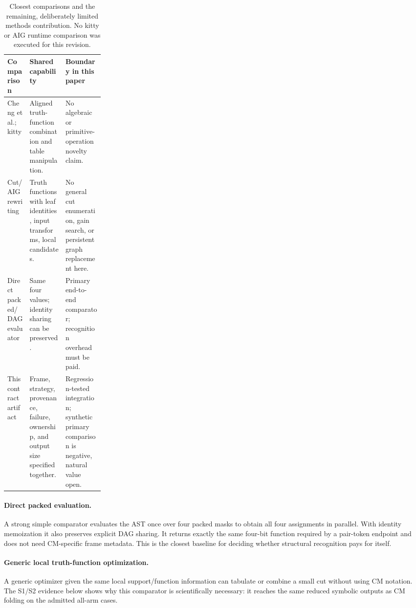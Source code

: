 \documentclass[10pt]{article}
\theoremstyle{plain}
\theoremstyle{definition}
\theoremstyle{remark}
\begin{document}
\begin{table}[H]
\small\centering
\begin{tabularx}{\linewidth}{@{}p{0.23\linewidth}XX@{}}
\toprule
\textbf{Comparison} & \textbf{Shared capability} & \textbf{Boundary in this paper}\\
\midrule
Cheng et al.; kitty & Aligned truth-function combination and table manipulation. & No algebraic or primitive-operation novelty claim.\\
Cut/AIG rewriting & Truth functions with leaf identities, input transforms, local candidates. & No general cut enumeration, gain search, or persistent graph replacement here.\\
Direct packed/DAG evaluator & Same four values; identity sharing can be preserved. & Primary end-to-end comparator; recognition overhead must be paid.\\
This contract artifact & Frame, strategy, provenance, failure, ownership, and output size specified together. & Regression-tested integration; synthetic primary comparison is negative, natural value open.\\
\bottomrule
\end{tabularx}
\caption{Closest comparisons and the remaining, deliberately limited methods contribution. No kitty or AIG runtime comparison was executed for this revision.}
\end{table}

\paragraph{Direct packed evaluation.}
A strong simple comparator evaluates the AST once over four packed masks to obtain all four assignments in parallel. With identity memoization it also preserves explicit DAG sharing. It returns exactly the same four-bit function required by a pair-token endpoint and does not need CM-specific frame metadata. This is the closest baseline for deciding whether structural recognition pays for itself.

\paragraph{Generic local truth-function optimization.}
A generic optimizer given the same local support/function information can tabulate or combine a small cut without using CM notation. The S1/S2 evidence below shows why this comparator is scientifically necessary: it reaches the same reduced symbolic outputs as CM folding on the admitted all-arm cases.
\end{document}
